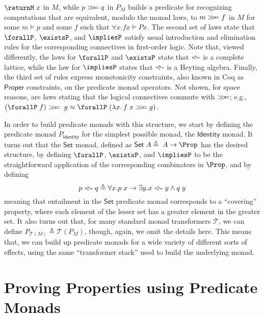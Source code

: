 \documentclass[preprint]{sigplanconf}
\begin{document}
$\returnM\;x$ in $M$, while $p>\!\!>\!\!= q$ in $P_M$ builds a predicate for
recognizing computations that are equivalent, modulo the monad laws, to
$m>\!\!>\!\!= f$ in $M$ for some $m\vDash p$ and some $f$ such that
$\forall x.f x \vDash P x$.
%
The second set of laws state that $\forallP$, $\existsP$, and $\impliesP$
satisfy usual introduction and elimination rules for the corresponding
connectives in first-order logic. Note that, viewed differently, the laws for
$\forallP$ and $\existsP$ state that $<\!\!\sim$ is a complete lattice, while the
law for $\impliesP$ states that $<\!\!\sim$ is a Heyting algebra.
%
Finally, the third set of rules express monotonicity constraints, also known in
Coq as $\mathsf{Proper}$ constraints, on the predicate monad operators.
%
Not shown, for space reasons, are laws stating that the logical connectives
commute with $>\!\!>\!\!=$; e.g.,
$(\forallP\;f)\bind\;g\lreq\forallP\;(\lamabsnot{x}{f\;x\bind g})$.


In order to build predicate monads with this structure, we start by defining the
predicate monad $P_{\mathsf{Identity}}$ for the simplest possible monad, the
$\mathsf{Identity}$ monad. It turns out that the $\mathsf{Set}$ monad, defined as
$\mathsf{Set}\;A\triangleq\;A\to\Prop$ has the desired structure, by defining
$\forallP$, $\existsP$, and $\impliesP$ to be the straightforward application of
the corresponding combinators in $\Prop$, and by defining
\[
p <\!\!\sim q \triangleq \forall x. p\;x \to \exists y. x<\!\!\sim y \wedge q\;y
\]
meaning that entailment in the $\mathsf{Set}$ predicate monad corresponds to
a ``covering'' property, where each element of the lesser set has a greater
element in the greater set.
%
It also turns out that, for many standard monad transformers $\mathcal{T}$, we
can define $P_{\mathcal{T}(M)}\triangleq\mathcal{T}(P_M)$, though, again, we
omit the details here. This means that, we can build up predicate monads for a
wide variety of different sorts of effects, using the same ``transformer stack''
used to build the underlying monad.


\section{Proving Properties using Predicate Monads}
\end{document}
